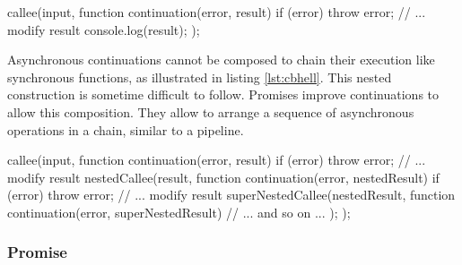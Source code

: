 \begin{code}[js, %
             caption={Example of a continuation}, %
             label={lst:continuation}] %
callee(input, function continuation(error, result) {
  if (error)
    throw error;
  // ... modify result
  console.log(result);
});
\end{code}


Asynchronous continuations cannot be composed to chain their execution like synchronous functions, as illustrated in listing \ref{lst:cbhell}.
This nested construction is sometime difficult to follow.
Promises improve continuations to allow this composition.
They allow to arrange a sequence of asynchronous operations in a chain, similar to a pipeline.

\begin{code}[js, %
             caption={Example of a sequence of continuations}, %
             label={lst:cbhell}] %

callee(input, function continuation(error, result) {
  if (error)
    throw error;
  // ... modify result
  nestedCallee(result, function continuation(error, nestedResult) {
    if (error)
      throw error;
    // ... modify result
    superNestedCallee(nestedResult, function continuation(error, superNestedResult) {
      // ... and so on ...
    }
  });
});
\end{code}

\subsubsection{Promise} \label{chapter4:event-loop:promise}

